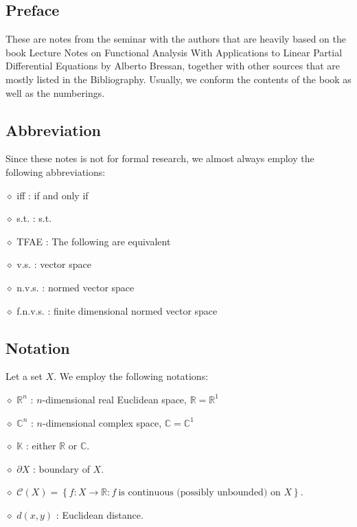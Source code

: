 \documentclass[11pt,a4paper]{report}
\theoremstyle{definition}
\begin{document}
\newpage

\subsection*{Preface}

These are notes from the seminar with the authors that are heavily based on the book Lecture Notes on Functional Analysis With Applications to Linear Partial Differential Equations by Alberto Bressan, together with other sources that are mostly listed in the Bibliography. 
Usually, we conform the contents of the book as well as the numberings.

\subsection*{Abbreviation}

Since these notes is not for formal research, we almost always employ the following abbreviations:

\noindent $\diamond$ iff : if and only if

\noindent $\diamond$ s.t. : s.t.

\noindent $\diamond$ TFAE : The following are equivalent

\noindent $\diamond$ v.s. : vector space

\noindent $\diamond$ n.v.s. : normed vector space

\noindent $\diamond$ f.n.v.s. : finite dimensional normed vector space

\subsection*{Notation}

Let a set $X$. 
We employ the following notations:

\noindent $\diamond$ $\mathbb{R}^{n}$ : $n$-dimensional real Euclidean space, $\mathbb{R}=\mathbb{R}^{1}$

\noindent $\diamond$ $\mathbb{C}^{n}$ : $n$-dimensional complex space, $\mathbb{C}=\mathbb{C}^{1}$

\noindent $\diamond$ $\mathbb{K}$ : either $\mathbb{R}$ or $\mathbb{C}$.

\noindent $\diamond$ $\partial X$ : boundary of $X$.

\noindent $\diamond$ $\mathcal{C}(X) = \left\{ f:X \to \mathbb{R}  :  f~\text{is continuous (possibly unbounded) on }X \right\}$.

\noindent $\diamond$ $d(x,y)$ : Euclidean distance.
\end{document}
